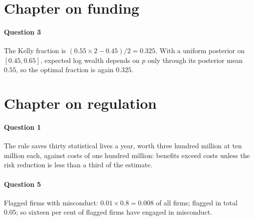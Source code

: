 \section*{Chapter on funding}
\paragraph{Question 3} The Kelly fraction is $(0.55\times 2 - 0.45)/2 = 0.325$. With a uniform posterior on $[0.45, 0.65]$, expected log wealth depends on $p$ only through its posterior mean $0.55$, so the optimal fraction is again $0.325$.

\section*{Chapter on regulation}
\paragraph{Question 1} The rule saves thirty statistical lives a year, worth three hundred million at ten million each, against costs of one hundred million: benefits exceed costs unless the risk reduction is less than a third of the estimate.
\paragraph{Question 5} Flagged firms with misconduct: $0.01\times 0.8 = 0.008$ of all firms; flagged in total $0.05$; so sixteen per cent of flagged firms have engaged in misconduct.
